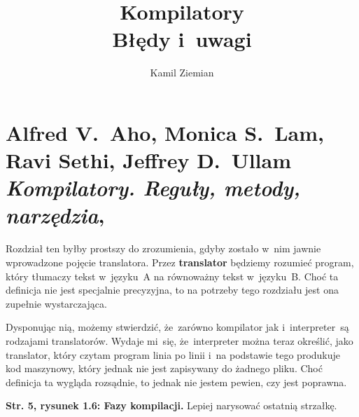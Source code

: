 \documentclass[a4paper,11pt]{article}
\title{Kompilatory \\
  {\Large Błędy i~uwagi}}
\author{Kamil Ziemian}
\numberwithin{equation}{section}
\begin{document}





\maketitle










\section{Alfred V.~Aho, Monica S.~Lam, Ravi Sethi,
  Jeffrey D.~Ullam \textit{Kompilatory. Reguły, metody,
    narzędzia},
  \parencite{Aho-Lam-Sethi-Ullman-Kompilatory-Pub-2019}}

\vspace{0em}



\vspace{0em}


\noindent
Rozdział ten byłby prostszy do zrozumienia, gdyby zostało w~nim jawnie
wprowadzone pojęcie translatora. Przez \textbf{translator} będziemy rozumieć
program, który tłumaczy tekst w~języku~A na równoważny tekst w~języku~B.
Choć ta definicja nie jest specjalnie precyzyjna, to na potrzeby tego
rozdziału jest ona zupełnie wystarczająca.

Dysponując nią, możemy stwierdzić, że~zarówno kompilator jak
i~interpreter~są rodzajami translatorów. Wydaje mi~się, że~interpreter można
teraz określić, jako translator, który czytam program linia po linii i~na
podstawie tego produkuje kod maszynowy, który jednak nie jest zapisywany
do żadnego pliku. Choć definicja ta wygląda rozsądnie, to jednak nie jestem
pewien, czy jest poprawna.

\VerSpaceFour





\noindent
\textbf{Str. 5, rysunek 1.6: Fazy kompilacji.} Lepiej narysować ostatnią
strzałkę.
\end{document}
